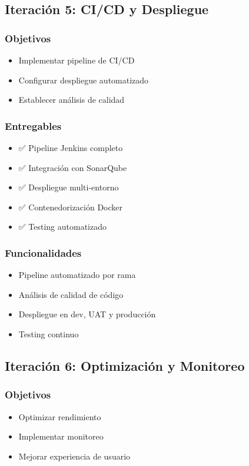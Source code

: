 \documentclass[12pt,a4paper]{article}
\begin{document}
\subsection{Iteración 5: CI/CD y Despliegue}

\subsubsection{Objetivos}
\begin{itemize}
    \item Implementar pipeline de CI/CD
    \item Configurar despliegue automatizado
    \item Establecer análisis de calidad
\end{itemize}

\subsubsection{Entregables}
\begin{itemize}
    \item ✅ Pipeline Jenkins completo
    \item ✅ Integración con SonarQube
    \item ✅ Despliegue multi-entorno
    \item ✅ Contenedorización Docker
    \item ✅ Testing automatizado
\end{itemize}

\subsubsection{Funcionalidades}
\begin{itemize}
    \item Pipeline automatizado por rama
    \item Análisis de calidad de código
    \item Despliegue en dev, UAT y producción
    \item Testing continuo
\end{itemize}

\subsection{Iteración 6: Optimización y Monitoreo}

\subsubsection{Objetivos}
\begin{itemize}
    \item Optimizar rendimiento
    \item Implementar monitoreo
    \item Mejorar experiencia de usuario
\end{itemize}
\end{document}
